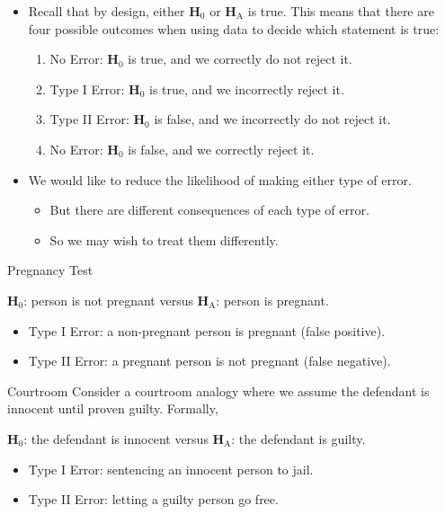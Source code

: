 \begin{itemize}
    \item Recall that by design, either $ \mathbf{H}_0 $ or $ \mathbf{H}_\text{A} $ is true.
          This means that there are four possible outcomes when using data to decide which
          statement is true:
          \begin{enumerate}[(1)]
              \item No Error: $ \mathbf{H}_0 $ is true, and we correctly do not reject it.
              \item Type I Error: $ \mathbf{H}_0 $ is true, and we incorrectly reject it.
              \item Type II Error: $ \mathbf{H}_0 $ is false, and we incorrectly do not reject it.
              \item No Error: $ \mathbf{H}_0 $ is false, and we correctly reject it.
          \end{enumerate}
    \item We would like to reduce the likelihood of making either type of error.
          \begin{itemize}
              \item But there are different consequences of each type of error.
              \item So we may wish to treat them differently.
          \end{itemize}
\end{itemize}
\begin{Example}{Pregnancy Test}{}
    \begin{tightcenter}
        $ \mathbf{H}_0 $: person is not pregnant versus $ \mathbf{H}_\text{A} $: person is pregnant.
    \end{tightcenter}
    \begin{itemize}
        \item Type I Error: a non-pregnant person is pregnant (false positive).
        \item Type II Error: a pregnant person is not pregnant (false negative).
    \end{itemize}
\end{Example}
\begin{Example}{Courtroom}{}
    Consider a courtroom analogy where we assume the defendant is innocent until proven guilty. Formally,
    \begin{tightcenter}
        $ \mathbf{H}_0 $: the defendant is innocent versus $ \mathbf{H}_\text{A} $: the defendant is guilty.
    \end{tightcenter}
    \begin{itemize}
        \item Type I Error: sentencing an innocent person to jail.
        \item Type II Error: letting a guilty person go free.
    \end{itemize}
\end{Example}

